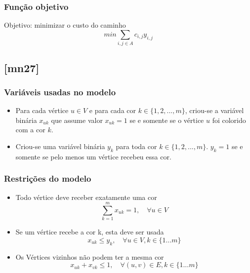 \documentclass[11pt,letterpaper]{article}
\begin{document}
\subsubsection*{Função objetivo}
Objetivo: minimizar o custo do caminho 
\begin{equation}
  min\sum_{{i,j} \in A}c_{i,j}y_{i,j}
\end{equation}

\subsection{{[}mn27{]}}

\subsubsection*{Variáveis usadas no modelo}
\begin{itemize}
\item Para cada vértice $u \in V$ e para cada cor $k \in \{1,2,...,m\}$, criou-se
  a variável binária $x_{uk}$ que assume valor $x_{uk}=1$ se e somente se o vértice $u$ foi
  colorido com a cor $k$.

\item Criou-se uma variável binária $y_k$ para toda cor $k \in
  \{1,2,...,m\}$. $y_k=1$ se e somente se pelo menos um vértice recebeu essa cor.
\end{itemize}

\subsubsection*{Restrições do modelo}
\begin{itemize}

\item Todo vértice deve receber exatamente uma cor
  \begin{equation*}
    \sum_{k=1}^{m}x_{uk}=1,\quad \forall u \in V
  \end{equation*}

\item Se um vértice recebe a cor k, esta deve ser usada
  \begin{equation*}
    x_{uk} \leq y_k, \quad\forall u \in V, k \in \{1 ... m\}
  \end{equation*}

\item Os Vértices vizinhos não podem ter a mesma cor
  \begin{equation*}
    x_{uk} + x_{vk} \leq 1, \quad\forall (u,v) \in E, k \in \{1 ... m\}
  \end{equation*}
  
\end{itemize}
\end{document}
